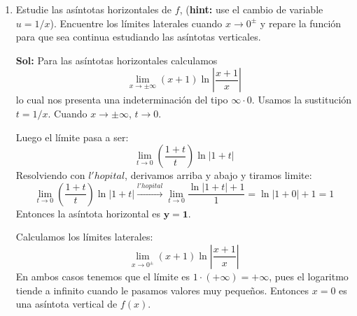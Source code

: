 \documentclass[letterpaper,12pt]{article}
\theoremstyle{plain}
\theoremstyle{definition}
\begin{document}
\begin{enumerate}
\begin{enumerate}
Para los signos de $f$, analizamos los signos en los intervalos definidos por los puntos críticos $-1, 0$ y el cero $-1/2$. Esto lo hacemos por la tabla de signos.

\begin{center}
\renewcommand{\arraystretch}{1.2}
\begin{tabular}{|l|c|c|c|c|}
\hline
\textbf{Signo de $f(x)$} & \textbf{$(-\infty, -1)$} & \textbf{$(-1, -1/2)$} & \textbf{$(-1/2, 0)$} & \textbf{$(0, \infty)$} \\
\hline
$(x+1)$ & $-$ & $+$ & $+$ & $+$ \\
\hline
$\ln(\frac{x+1}{x})$ & $-$ & $-$ & $+$ & $+$ \\
\hline
$\mathbf{(x+1) \cdot \ln(\frac{x+1}{x})}$ & $\mathbf{+}$ & $\mathbf{-}$ & $\mathbf{+}$ & $\mathbf{+}$ \\
\hline
\end{tabular}
\end{center}
En resumen tenemos que, $f(x) > 0$ (positiva) en $(-\infty, -1) \cup (-1/2, 0) \cup (0, \infty)$, $f(x) < 0$ (negativa) en $(-1, -1/2)$.
\color{black}
    
    \item Estudie las asíntotas horizontales de $f$, (\textbf{hint:} use el cambio de variable $u=1/x$). Encuentre los límites laterales cuando $x \to 0^{\pm}$ y repare la función para que sea continua estudiando las asíntotas verticales. 
    
    \color{blue}
\textbf{Sol:} Para las asíntotas horizontales calculamos
\[
\lim_{x \to \pm\infty} (x + 1) \ln \left| \frac{x + 1}{x} \right|
\]
lo cual nos presenta una indeterminación del tipo $\infty \cdot 0$. Usamos la sustitución $t = 1/x$. Cuando $x \to \pm\infty$, $t \to 0$.

Luego el límite pasa a ser:
\[
\lim_{t \to 0} \left( \frac{1 + t}{t} \right) \ln|1+t|
\]
Resolviendo con $l'hopital$, derivamos arriba y abajo y tiramos limite:
$$
\lim_{t \to 0} \left( \frac{1 + t}{t} \right) \ln|1+t| \xrightarrow{l'hopital}\lim_{t \to 0} \frac{\ln|1+t|+1}{1}= \ln|1+0|+1=1
$$
Entonces la asíntota horizontal es $\mathbf{y = 1}$.

Calculamos los límites laterales:
\[
\lim_{x \to 0^{\pm}} (x + 1) \ln \left| \frac{x + 1}{x} \right|
\]
En ambos casos tenemos que el límite es $1 \cdot (+\infty) = +\infty$, pues el logaritmo tiende a infinito cuando le pasamos valores muy pequeños. Entonces $x=0$ es una asíntota vertical de $f(x)$.


\end{enumerate}
\end{enumerate}
\end{document}
